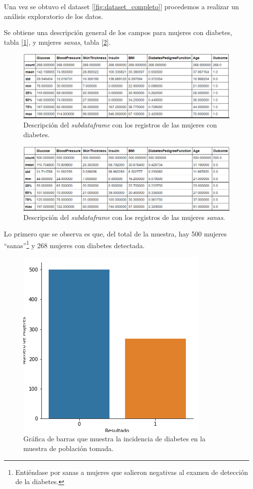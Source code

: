 \documentclass{article}
\begin{document}
Una vez se obtuvo el dataset [\ref{fig:dataset_completo}] procedemos a realizar un análisis exploratorio de los datos.

Se obtiene una descripción general de los campos para mujeres con diabetes, tabla [\ref{fig:desc_diabetes}], y mujeres \emph{sanas}, tabla [\ref{fig:desc_sana}].

\begin{figure}[H]
	\centering
	\includegraphics[width=0.9\linewidth]{desc_diabetes.png}
	\caption{Descripción del \emph{subdataframe} con los registros de las mujeres con diabetes.}%
	\label{fig:desc_diabetes}
\end{figure}

\begin{figure}[H]
	\centering
	\includegraphics[width=0.9\linewidth]{desc_sana.png}
	\caption{Descripción del \emph{subdataframe} con los registros de las mujeres \emph{sanas}.}%
	\label{fig:desc_sana}
\end{figure}

Lo primero que se observa es que, del total de la muestra, hay 500 mujeres ``sanas''\footnote{Entiéndase por sanas a mujeres que salieron negativas al examen de detección de la diabetes.} y 268 mujeres con diabetes detectada.

\begin{figure}[H]
	\centering
	\includegraphics[width=0.65\linewidth]{bar_diabetes.png}
	\caption{Gráfica de barras que muestra la incidencia de diabetes en la muestra de población tomada.}%
	\label{fig:bar_diabetes}
\end{figure}
\end{document}

